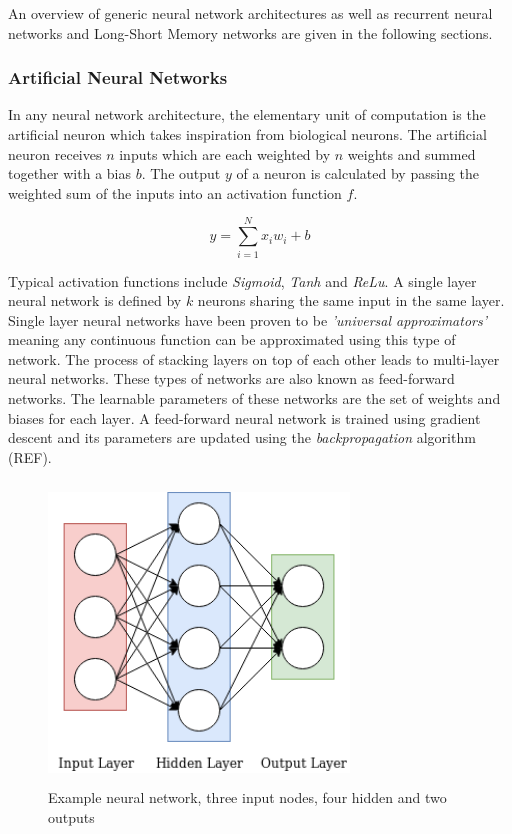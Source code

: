 \noindent
\newline
An overview of generic neural network architectures as well as recurrent neural networks and Long-Short Memory networks are given in the following sections.

\subsubsection{Artificial Neural Networks}
In any neural network architecture, the elementary unit of computation is the artificial neuron which takes inspiration from biological neurons. The artificial neuron receives \(n\) inputs which are each weighted by \(n\) weights and summed together with a bias \(b\). The output \(y\) of a neuron is calculated by passing the weighted sum of the inputs into an activation function \(f\). 

\begin{equation}
	y = \sum_{i=1}^{N} x_{i}w_{i} + b
\end{equation}

\noindent
\newline
Typical activation functions include \textit{Sigmoid}, \textit{Tanh} and \textit{ReLu}. A single layer neural network is defined by \(k\) neurons sharing the same input in the same layer. Single layer neural networks have been proven to be \textit{'universal approximators'} meaning any continuous function can be approximated using this type of network. The process of stacking layers on top of each other leads to multi-layer neural networks. These types of networks are also known as feed-forward networks. The learnable parameters of these networks are the set of weights and biases for each layer. A feed-forward neural network is trained using gradient descent and its parameters are updated using the \textit{backpropagation} algorithm (REF).

\begin{figure}[h]
	\includegraphics[width=8cm, height=8cm]{./figures/fig2}
	\centering
	\caption{Example neural network, three input nodes, four hidden and two outputs}
	\label{fig:fig2}
\end{figure}

